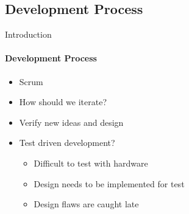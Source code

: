 \subsection{Development Process}
\begin{frame}{Introduction}\framesubtitle{Development Process}
    \begin{itemize}
        \item Scrum
        \item How should we iterate?
        \item Verify new ideas and design
        \item Test driven development?
        \begin{itemize}
            \item Difficult to test with hardware
            \item Design needs to be implemented for test
            \item Design flaws are caught late
        \end{itemize}
    \end{itemize}
\end{frame}

